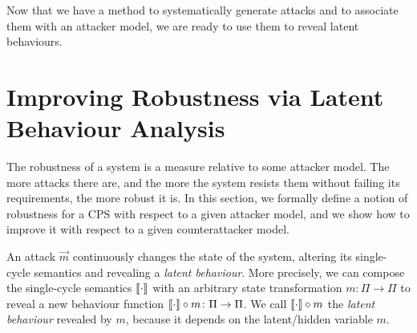 {%

Now that we have a method to systematically generate attacks and to associate them with an attacker model, we are ready to use them to reveal latent behaviours. 

\section{Improving Robustness via Latent Behaviour Analysis}
\label{sec:LatentBehaviours}
The robustness of a system is a measure relative to some attacker model. The more attacks there are, and the more the system resists them without failing its requirements, the more robust it is. In this section, we formally define a notion of robustness for a CPS with respect to a given attacker model, and we show how to improve it with respect to a given counterattacker model.

An attack $\vec{m}$ continuously changes the state of the system, altering its single-cycle semantics and revealing a \emph{latent behaviour}. More precisely, we can compose the single-cycle semantics ${{{\llbracket\cdot\rrbracket}}}$ with an arbitrary state transformation $m\colon \Pi\rightarrow\Pi$ to reveal a new behaviour function ${{{\llbracket\cdot\rrbracket}}}\circ m\colon\Pi\rightarrow\Pi$. We call ${{{\llbracket\cdot\rrbracket}}}\circ m$ the \emph{latent behaviour} revealed by $m$, because it depends on the latent/hidden variable $m$. 

}
